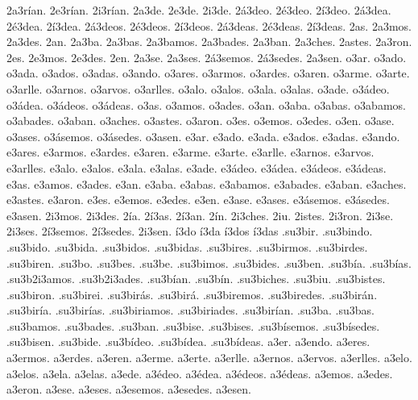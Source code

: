 {2a3rían. 2e3rían. 2i3rían. 
%
2a3de. 2e3de. 2i3de. 
%
2á3deo. 2é3deo. 2í3deo. 
2á3dea. 2é3dea. 2í3dea. 
2á3deos. 2é3deos. 2í3deos. 
2á3deas. 2é3deas. 2í3deas. 
%
2as. 2a3mos. 2a3des. 2an. 
2a3ba. 2a3bas. 2a3bamos. 2a3bades. 2a3ban. 
2a3ches. 2astes. 2a3ron. 
2es. 2e3mos. 2e3des. 2en. 
2a3se. 2a3ses. 2á3semos. 2á3sedes. 2a3sen. 
%
o3ar. o3ado. o3ada. o3ados. o3adas. o3ando. 
o3ares. o3armos. o3ardes. o3aren. 
o3arme. o3arte. o3arlle. o3arnos. o3arvos. o3arlles. 
o3alo. o3alos. o3ala. o3alas. 
o3ade. o3ádeo. o3ádea. o3ádeos. o3ádeas. 
o3as. o3amos. o3ades. o3an. 
o3aba. o3abas. o3abamos. o3abades. o3aban. 
o3aches. o3astes. o3aron. 
o3es. o3emos. o3edes. o3en. 
o3ase. o3ases. o3ásemos. o3ásedes. o3asen. 
%
e3ar. e3ado. e3ada. e3ados. e3adas. e3ando. 
e3ares. e3armos. e3ardes. e3aren. 
e3arme. e3arte. e3arlle. e3arnos. e3arvos. e3arlles. 
e3alo. e3alos. e3ala. e3alas. 
e3ade. e3ádeo. e3ádea. e3ádeos. e3ádeas. 
e3as. e3amos. e3ades. e3an. 
e3aba. e3abas. e3abamos. e3abades. e3aban. 
e3aches. e3astes. e3aron. 
e3es. e3emos. e3edes. e3en. 
e3ase. e3ases. e3ásemos. e3ásedes. e3asen. 
%
2i3mos. 2i3des. 
2ía. 2í3as. 2í3an. 
2ín. 2i3ches. 2iu. 2istes. 2i3ron. 
2i3se. 2i3ses. 2í3semos. 2í3sedes. 2i3sen. 
%
í3do í3da í3dos í3das 
%
.su3bir. .su3bindo. .su3bido. .su3bida. .su3bidos. .su3bidas. 
.su3bires. .su3birmos. .su3birdes. .su3biren. 
.su3bo. .su3bes. .su3be. .su3bimos. .su3bides. .su3ben. 
.su3bía. .su3bías. .su3b2i3amos. .su3b2i3ades. .su3bían. 
.su3bín. .su3biches. .su3biu. .su3bistes. .su3biron. 
.su3birei. .su3birás. .su3birá. .su3biremos. .su3biredes. .su3birán. 
.su3biría. .su3birías. .su3biriamos. .su3biriades. .su3birían. 
.su3ba. .su3bas. .su3bamos. .su3bades. .su3ban. 
.su3bise. .su3bises. .su3bísemos. .su3bísedes. .su3bisen. 
.su3bide. .su3bídeo. .su3bídea. .su3bídeas. 
%
a3er. a3endo. 
a3eres. a3ermos. a3erdes. a3eren. 
a3erme. a3erte. a3erlle. a3ernos. a3ervos. a3erlles. 
a3elo. a3elos. a3ela. a3elas. 
a3ede. a3édeo. a3édea. a3édeos. a3édeas. 
a3emos. a3edes. a3eron. 
a3ese. a3eses. a3esemos. a3esedes. a3esen. 
}
